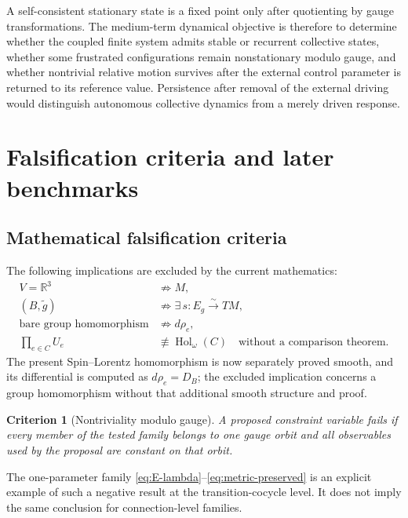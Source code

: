 \documentclass[11pt,a4paper]{article}
\newtheorem{criterion}[definition]{Criterion}
\theoremstyle{remark}
\newcommand{\R}{\mathbb{R}}
\newcommand{\Hol}{\operatorname{Hol}}
\begin{document}
A self-consistent stationary state is a fixed point only after quotienting by gauge transformations.  The medium-term dynamical objective is therefore to determine whether the coupled finite system admits stable or recurrent collective states, whether some frustrated configurations remain nonstationary modulo gauge, and whether nontrivial relative motion survives after the external control parameter is returned to its reference value.  Persistence after removal of the external driving would distinguish autonomous collective dynamics from a merely driven response.

\section{Falsification criteria and later benchmarks}

\subsection{Mathematical falsification criteria}

The following implications are excluded by the current mathematics:
\begin{align}
  V=\R^3
  &\not\Longrightarrow M,
\tag{6.1a}\\
  (B,\widetilde g)
  &\not\Longrightarrow
  \exists\,s:E_g\xrightarrow{\sim}TM,
\tag{6.1b}\\
  \text{bare group homomorphism}
  &\not\Longrightarrow d\rho_e,
\tag{6.1c}\\
  \prod_{e\in C}U_e
  &\not\equiv\Hol_{\omega}(C)
  \quad\text{without a comparison theorem}.
\tag{6.1d}
\end{align}
The present Spin--Lorentz homomorphism is now separately proved smooth, and its differential is computed as \(d\rho_e=D_B\); the excluded implication concerns a group homomorphism without that additional smooth structure and proof.

\begin{criterion}[Nontriviality modulo gauge]
A proposed constraint variable fails if every member of the tested family belongs to one gauge orbit and all observables used by the proposal are constant on that orbit.
\end{criterion}

The one-parameter family \eqref{eq:E-lambda}--\eqref{eq:metric-preserved} is an explicit example of such a negative result at the transition-cocycle level.  It does not imply the same conclusion for connection-level families.
\end{document}
